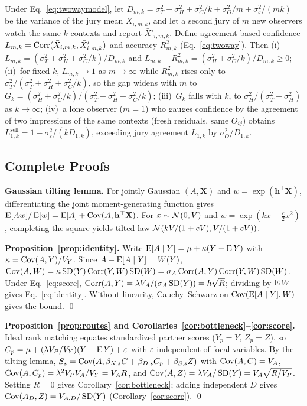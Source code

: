 \begin{proposition}\label{prop:confidence}
Under Eq.~\eqref{eq:twowaymodel}, let $D_{m,k}=\sigma_T^2+\sigma_H^2+\sigma_C^2/k+\sigma_O^2/m+\sigma_\varepsilon^2/(mk)$ be the variance of the jury mean $\bar X_{i,m,k}$, and let a second jury of $m$ new observers watch the same $k$ contexts and report $\bar X'_{i,m,k}$. Define agreement-based confidence $L_{m,k}=\operatorname{Corr}(\bar X_{i,m,k},\bar X'_{i,m,k})$ and accuracy $R^2_{m,k}$ (Eq.~\eqref{eq:twoway}). Then (i)~$L_{m,k}=(\sigma_T^2+\sigma_H^2+\sigma_C^2/k)/D_{m,k}$ and $L_{m,k}-R^2_{m,k}=(\sigma_H^2+\sigma_C^2/k)/D_{m,k}\ge 0$; (ii)~for fixed $k$, $L_{m,k}\to 1$ as $m\to\infty$ while $R^2_{m,k}$ rises only to $\sigma_T^2/(\sigma_T^2+\sigma_H^2+\sigma_C^2/k)$, so the gap widens with $m$ to $G_k=(\sigma_H^2+\sigma_C^2/k)/(\sigma_T^2+\sigma_H^2+\sigma_C^2/k)$; (iii)~$G_k$ falls with $k$, to $\sigma_H^2/(\sigma_T^2+\sigma_H^2)$ as $k\to\infty$; (iv)~a lone observer ($m=1$) who gauges confidence by the agreement of two impressions of the same contexts (fresh residuals, same $O_{ij}$) obtains $L^{\mathrm{self}}_{1,k}=1-\sigma_\varepsilon^2/(kD_{1,k})$, exceeding jury agreement $L_{1,k}$ by $\sigma_O^2/D_{1,k}$.
\end{proposition}

\subsection{Complete Proofs}\label{app:proofs}
\noindent\textbf{Gaussian tilting lemma.} For jointly Gaussian $(A,\mathbf X)$ and $w=\exp(\mathbf h^\top\mathbf X)$, differentiating the joint moment-generating function gives $\operatorname{E}[Aw]/\operatorname{E}[w]=\operatorname{E}[A]+\operatorname{Cov}(A,\mathbf h^\top\mathbf X)$. For $x\sim\mathcal{N}(0,V)$ and $w=\exp(kx-\tfrac c2x^2)$, completing the square yields tilted law $\mathcal{N}(kV/(1+cV),V/(1+cV))$.

\noindent\textbf{Proposition~\ref{prop:identity}.} Write $\operatorname{E}[A\mid Y]=\mu+\kappa(Y-\operatorname{E} Y)$ with $\kappa=\operatorname{Cov}(A,Y)/V_Y$. Since $A-\operatorname{E}[A\mid Y]\perp W(Y)$, $\operatorname{Cov}(A,W)=\kappa\operatorname{SD}(Y)\operatorname{Corr}(Y,W)\operatorname{SD}(W)=\sigma_A\operatorname{Corr}(A,Y)\operatorname{Corr}(Y,W)\operatorname{SD}(W)$. Under Eq.~\eqref{eq:score}, $\operatorname{Corr}(A,Y)=\lambda V_A/(\sigma_A\operatorname{SD}(Y))=h\sqrt{R}$; dividing by $\operatorname{E} W$ gives Eq.~\eqref{eq:identity}. Without linearity, Cauchy--Schwarz on $\operatorname{Cov}(\operatorname{E}[A\mid Y],W)$ gives the bound. \qed

\noindent\textbf{Proposition~\ref{prop:routes} and Corollaries~\ref{cor:bottleneck}--\ref{cor:score}.} Ideal rank matching equates standardized partner scores ($Y_p=Y$, $Z_p=Z$), so $C_p=\mu+(\lambda V_P/V_Y)(Y-\operatorname{E} Y)+\varepsilon$ with $\varepsilon$ independent of focal variables. By the tilting lemma, $S_s=\operatorname{Cov}(A,\beta_{N,s}C+\beta_{D,s}C_p+\beta_{S,s}Z)$ with $\operatorname{Cov}(A,C)=V_A$, $\operatorname{Cov}(A,C_p)=\lambda^2V_PV_A/V_Y=V_AR$, and $\operatorname{Cov}(A,Z)=\lambda V_A/\operatorname{SD}(Y)=V_A\sqrt{R/V_P}$. Setting $R=0$ gives Corollary~\ref{cor:bottleneck}; adding independent $D$ gives $\operatorname{Cov}(A_D,Z)=V_{A,D}/\operatorname{SD}(Y)$ (Corollary~\ref{cor:score}). \qed

